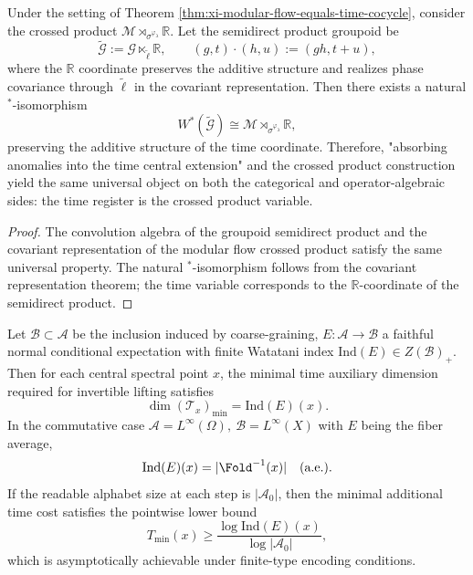 \begin{theorem}\label{thm:xi-time-register-crossed-product-equivalence}
Under the setting of Theorem \ref{thm:xi-modular-flow-equals-time-cocycle}, consider the crossed product
\(
\mathcal M\rtimes_{\sigma^{\varphi_\lambda}}\mathbb R
\).
Let the semidirect product groupoid be
\[
\widetilde{\mathcal G}:=\mathcal G\ltimes_{\widetilde\ell}\mathbb R,
\qquad
(g,t)\cdot(h,u):=(gh,t+u),
\]
where the \(\mathbb R\) coordinate preserves the additive structure and realizes phase covariance through \(\widetilde\ell\) in the covariant representation.
Then there exists a natural \(^\ast\)-isomorphism
\[
W^\ast(\widetilde{\mathcal G})
\cong
\mathcal M\rtimes_{\sigma^{\varphi_\lambda}}\mathbb R,
\]
preserving the additive structure of the time coordinate.
Therefore, "absorbing anomalies into the time central extension" and the crossed product construction yield the same universal object on both the categorical and operator-algebraic sides: the time register is the crossed product variable.
\end{theorem}

\begin{proof}
The convolution algebra of the groupoid semidirect product and the covariant representation of the modular flow crossed product satisfy the same universal property.
The natural \(^\ast\)-isomorphism follows from the covariant representation theorem; the time variable corresponds to the \(\mathbb R\)-coordinate of the semidirect product.
\end{proof}

\begin{theorem}\label{thm:xi-local-index-equals-local-time-fiber}
Let \(\mathcal B\subset\mathcal A\) be the inclusion induced by coarse-graining, \(E:\mathcal A\to\mathcal B\) a faithful normal conditional expectation with finite Watatani index \(\mathrm{Ind}(E)\in Z(\mathcal B)_+\).
Then for each central spectral point \(x\), the minimal time auxiliary dimension required for invertible lifting satisfies
\[
\dim(\mathcal T_x)_{\min}=\mathrm{Ind}(E)(x).
\]
In the commutative case
\(
\mathcal A=L^\infty(\Omega),\ \mathcal B=L^\infty(X)
\)
with \(E\) being the fiber average,
\[
\mathrm{Ind}(E)(x)=|\Fold^{-1}(x)|\quad\text{(a.e.)}.
\]
If the readable alphabet size at each step is \(|\mathcal A_0|\), then the minimal additional time cost satisfies the pointwise lower bound
\[
T_{\min}(x)\ge \frac{\log \mathrm{Ind}(E)(x)}{\log |\mathcal A_0|},
\]
which is asymptotically achievable under finite-type encoding conditions.
\end{theorem}

